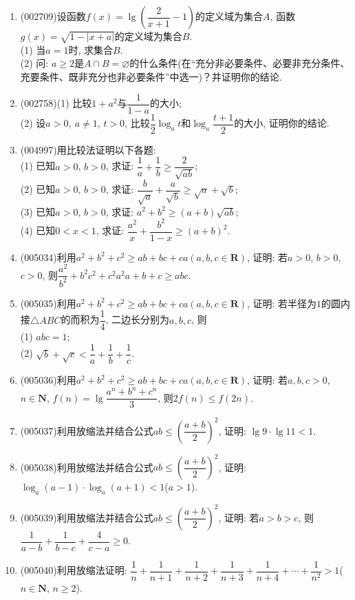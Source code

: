 \documentclass[10pt,a4paper]{article}
\begin{document}
\begin{enumerate}[1.]
\vspace*{24ex}
\item {\tiny (002709)}设函数$f(x)=\lg (\dfrac2{x+1}-1)$的定义域为集合$A$, 函数$g(x)=\sqrt{1-|x+a|}$的定义域为集合$B$.\\
(1) 当$a=1$时, 求集合$B$.\\
(2) 问: $a\ge 2$是$A\cap B=\varnothing$的什么条件(在``充分非必要条件、必要非充分条件、充要条件、既非充分也非必要条件''中选一)？并证明你的结论.
\item {\tiny (002758)}(1) 比较$1+a^2$与$\dfrac 1{1-a}$的大小;\\
(2) 设$a>0,\ a\ne 1$, $t>0$, 比较$\dfrac 12\log_at$和$\log_a\dfrac{t+1}2$的大小, 证明你的结论.
\item {\tiny (004997)}用比较法证明以下各题:\\
(1) 已知$a>0$, $b>0$, 求证: $\dfrac 1a+\dfrac 1b\ge \dfrac 2{\sqrt{ab}}$;\\
(2) 已知$a>0$, $b>0$, 求证: $\dfrac b{\sqrt a}+\dfrac a{\sqrt b}\ge \sqrt a+\sqrt b$;\\
(3) 已知$a>0$, $b>0$, 求证: ${a^2}+{b^2}\ge (a+b)\sqrt{ab}$;\\
(4) 已知$0<x<1$, 求证: $\dfrac{a^2}x+\dfrac{b^2}{1-x}\ge (a+b)^2$.
\item {\tiny (005034)}利用$a^2+b^2+c^2\ge ab+bc+ca(a,b,c\in \mathbf{R})$, 证明: 若$a>0$, $b>0$, $c>0$, 则$\dfrac{a^2}{b^2}+{b^2}{c^2}+{c^2}{a^2}{a+b+c}\ge abc$.
\item {\tiny (005035)}利用$a^2+b^2+c^2\ge ab+bc+ca(a,b,c\in \mathbf{R})$, 证明: 若半径为$1$的圆内接$\triangle ABC$的而积为$\dfrac 14$, 二边长分别为$a,b,c$, 则\\(1) $abc=1$;\\
(2) $\sqrt b+\sqrt c<\dfrac 1a+\dfrac 1b+\dfrac 1c$.
\item {\tiny (005036)}利用$a^2+b^2+c^2\ge ab+bc+ca(a,b,c\in \mathbf{R})$, 证明: 若$a,b,c>0$, $n\in \mathbf{N}$, $f(n)=\lg \dfrac{a^n+b^n+c^n}3$, 则$2f(n)\le f(2n)$.
\item {\tiny (005037)}利用放缩法并结合公式$ab\le (\dfrac{a+b}2)^2$, 证明: $\lg 9\cdot \lg 11<1$.
\item {\tiny (005038)}利用放缩法并结合公式$ab\le (\dfrac{a+b}2)^2$, 证明: $\log_a(a-1)\cdot \log_a(a+1)<1$($a>1$).
\item {\tiny (005039)}利用放缩法并结合公式$ab\le (\dfrac{a+b}2)^2$, 证明: 若$a>b>c$, 则$\dfrac 1{a-b}+\dfrac 1{b-c}+\dfrac 4{c-a}\ge 0$.
\item {\tiny (005040)}利用放缩法证明: $\dfrac 1n+\dfrac 1{n+1}+\dfrac 1{n+2}+\dfrac 1{n+3}+\dfrac 1{n+4}+\cdots +\dfrac 1{n^2}>1$($n\in \mathbf{N}$, $n\ge 2$).

\end{enumerate}
\end{document}
